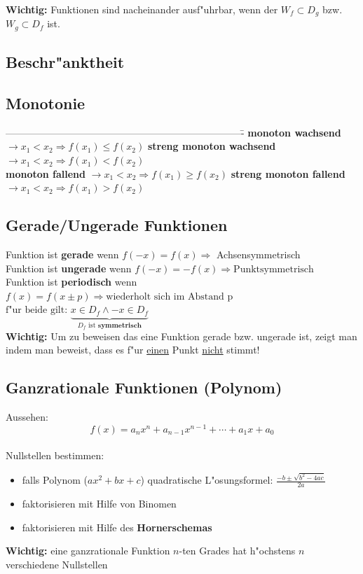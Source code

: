 \begin{flushleft}
	 		\textbf{Wichtig:} Funktionen sind nacheinander ausf"uhrbar, wenn der $W_f \subset D_g$ bzw. $W_g \subset D_f$  ist.
			
		\subsection{Beschr"anktheit}
			
		\subsection{Monotonie}
			\begin{tabbing}
				-------------------------------------------------------------------------\= \kill
				\textbf{monoton wachsend} $\longrightarrow x_1<x_2 \Rightarrow f(x_1)\leq f(x_2)$\>
				\textbf{streng monoton wachsend} $\longrightarrow x_1<x_2 \Rightarrow f(x_1) < f(x_2)$\\
				\textbf{monoton fallend} $\longrightarrow x_1<x_2 \Rightarrow f(x_1)\geq f(x_2)$\>
				\textbf{streng monoton fallend} $\longrightarrow x_1<x_2 \Rightarrow f(x_1)>f(x_2)$
			\end{tabbing}		
\newpage
		\subsection{Gerade/Ungerade Funktionen}
			Funktion ist \textbf{gerade} wenn $f(-x)=f(x)\Rightarrow$ Achsensymmetrisch\\
			Funktion ist \textbf{ungerade} wenn $ f(-x)=-f(x)\Rightarrow \text{Punktsymmetrisch}$\\
			Funktion ist \textbf{periodisch} wenn $f(x) = f(x \pm p)\Rightarrow \text{wiederholt sich im Abstand p}$ \qquad
			$\text{f"ur beide gilt: } \underbrace{ x \in D_f \land -x \in D_f}_{D_f \text{ ist } \textbf{symmetrisch}}$\\
			\textbf{Wichtig:} Um zu beweisen das eine Funktion gerade bzw. ungerade ist, zeigt man indem man beweist, dass es f"ur \underline{einen} Punkt \underline{nicht} stimmt!\\
		
		\subsection{Ganzrationale Funktionen (Polynom)}
			Aussehen: \[f(x)=a_nx^{n}+a_{n-1}x^{n-1}+\cdots+a_1x+a_0\]\\
			Nullstellen bestimmen:\\
			\begin{itemize}
				\item falls Polynom ($ax^{2}+bx+c$) quadratische L"osungsformel: $\frac{-b\pm\sqrt{b^{2}-4ac}}{2a}$
				\item faktorisieren mit Hilfe von Binomen
				\item faktorisieren mit Hilfe des \textbf{Hornerschemas}
			\end{itemize}
			\textbf{Wichtig:} eine ganzrationale Funktion $n$-ten Grades hat h"ochstens $n$ verschiedene Nullstellen


\end{flushleft}
